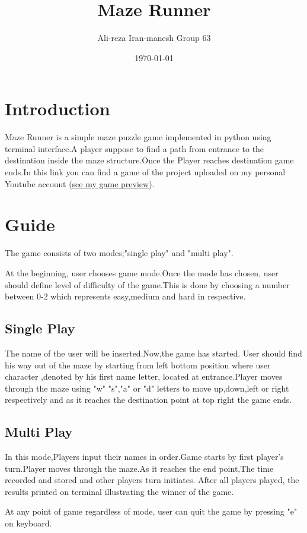 \documentclass[a4paper, 12pt]{article}
\title{\textbf{Maze Runner}}
\author{Ali-reza Iran-manesh Group 63}
\date{\today}
\begin{document}
	
\maketitle

\tableofcontents

\section{Introduction} \label{sec:introduction}
Maze Runner is a simple maze puzzle game implemented in python using terminal interface.A player suppose to find a path from entrance to the destination inside the maze structure.Once the Player reaches destination game ends.In this link you can find a game of the project uploaded on my personal Youtube account \href{https://youtu.be/eIO9C72n7Go}{(see my game preview)}.

\section{Guide} \label{sec:guide}
 The game consists of two modes;"single play" and "multi play".
 
 At the beginning, user chooses game mode.Once the mode has chosen, user should define level of difficulty of the game.This is done by choosing a number between 0-2 which represents easy,medium and hard in respective.
 \subsection{Single Play}
 The name of the user will be inserted.Now,the game has started.
 User should find his way out of the maze by starting from left bottom position where user character ,denoted by his first name letter, located at entrance.Player moves through the maze using "w" "s","a" or "d" letters to move up,down,left or right respectively and as it reaches the destination point at top right the game ends.

 \subsection{Multi Play}
 In this mode,Players input their names in order.Game starts by first player's turn.Player moves through the maze.As it reaches the end point,The time recorded and stored and other players turn initiates.
 After all players played, the results printed on terminal illustrating the winner of the game.

 At any point of game regardless of mode, user can quit the game by pressing "e" on keyboard.
\end{document}
